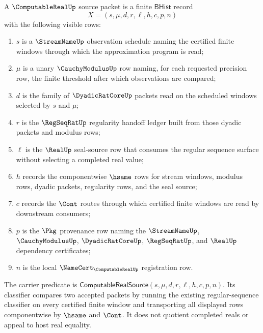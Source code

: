 \begin{definition}
\label{def:computable-real-source-packet}
A $\ComputableRealUp$ source packet is a finite $\mathsf{BHist}$ record
$$
X=(s,\mu,d,r,\ell,h,c,p,n)
$$
with the following visible rows:
\begin{enumerate}
\item $s$ is a $\StreamNameUp$ observation schedule naming the certified
finite windows through which the approximation program is read;
\item $\mu$ is a unary $\CauchyModulusUp$ row naming, for each requested
precision row, the finite threshold after which observations are compared;
\item $d$ is the family of $\DyadicRatCoreUp$ packets read on the scheduled
windows selected by $s$ and $\mu$;
\item $r$ is the $\RegSeqRatUp$ regularity handoff ledger built from those
dyadic packets and modulus rows;
\item $\ell$ is the $\RealUp$ seal-source row that consumes the regular
sequence surface without selecting a completed real value;
\item $h$ records the componentwise $\hsame$ rows for stream windows, modulus
rows, dyadic packets, regularity rows, and the seal source;
\item $c$ records the $\Cont$ routes through which certified finite windows
are read by downstream consumers;
\item $p$ is the $\Pkg$ provenance row naming the
$\StreamNameUp$, $\CauchyModulusUp$, $\DyadicRatCoreUp$, $\RegSeqRatUp$, and
$\RealUp$ dependency certificates;
\item $n$ is the local $\NameCert_{\ComputableRealUp}$ registration row.
\end{enumerate}
The carrier predicate is
$\mathsf{ComputableRealSource}(s,\mu,d,r,\ell,h,c,p,n)$. Its classifier
compares two accepted packets by running the existing regular-sequence
classifier on every certified finite window and transporting all displayed
rows componentwise by $\hsame$ and $\Cont$. It does not quotient completed
reals or appeal to host real equality.
\end{definition}

